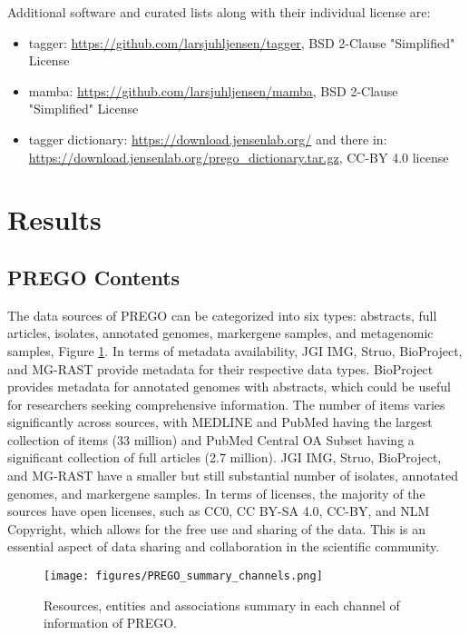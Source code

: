 Additional software and curated lists along with their individual license are:
   \begin{itemize}
      \item tagger:	\href{https://github.com/larsjuhljensen/tagger}{https://github.com/larsjuhljensen/tagger}, BSD 2-Clause "Simplified" License
      \item mamba: \href{https://github.com/larsjuhljensen/mamba}{https://github.com/larsjuhljensen/mamba}, BSD 2-Clause "Simplified" License 
      \item tagger dictionary:  \href{https://download.jensenlab.org/}{https://download.jensenlab.org/} and there in: \\
      \href{https://download.jensenlab.org/prego_dictionary.tar.gz}{https://download.jensenlab.org/prego\_dictionary.tar.gz}, CC-BY 4.0 license
   \end{itemize}

\section{Results}
\label{sec:prego-results}

   \subsection{PREGO Contents}
   \label{subsec:prego-contents}

The data sources of PREGO can be categorized into six types: abstracts, full articles,
isolates, annotated genomes, markergene samples, and metagenomic samples, Figure \ref{fig:prego-summary}.
In terms of metadata availability, JGI IMG, Struo, BioProject, and MG-RAST provide
metadata for their respective data types.
BioProject provides metadata for annotated genomes with abstracts, which could be useful for researchers seeking comprehensive information.
The number of items varies significantly across sources, with MEDLINE and PubMed
having the largest collection of items (33 million) and PubMed Central OA Subset
having a significant collection of full articles (2.7 million).
JGI IMG, Struo, BioProject, and MG-RAST have a smaller but still substantial number of isolates, annotated genomes, and markergene samples.
In terms of licenses, the majority of the sources have open licenses,
such as CC0, CC BY-SA 4.0, CC-BY, and NLM Copyright, which allows for the free
use and sharing of the data. This is an essential aspect of data sharing and
collaboration in the scientific community.

   \begin{figure}[hbt!]
      \centering
      \texttt{[image: figures/PREGO\_summary\_channels.png]}
      \caption[PREGO contents summary]{
         Resources, entities and associations summary in each channel of information of PREGO.}
      \label{fig:prego-summary}
   \end{figure}

